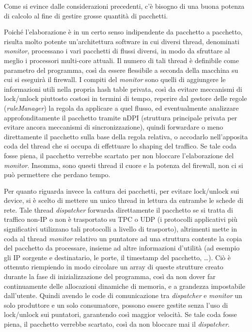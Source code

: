 Come si evince dalle considerazioni precedenti, c'è bisogno di una buona potenza di calcolo al fine di gestire grosse quantità di pacchetti.

Poiché l'elaborazione è in un certo senso indipendente da pacchetto a pacchetto, risulta molto potente un'architettura software in cui diversi thread, denominati \emph{monitor}, processano i vari pacchetti di flussi diversi, in modo da sfruttare al meglio i processori multi-core attuali. Il numero di tali thread è definibile come parametro del programma, così da essere flessibile a seconda della macchina su cui si eseguirà il firewall. I compiti del \emph{monitor} sono quelli di aggiungere le informazioni utili nella propria hash table privata, così da evitare meccanismi di lock/unlock piuttosto costosi in termini di tempo, reperire dal gestore delle regole (\emph{ruleManager}) la regola da applicare a quel flusso, ed eventualmente analizzare approfonditamente il pacchetto tramite nDPI (struttura principale privata per evitare ancora meccanismi di sincronizzazione), quindi forwardare o meno direttamente il pacchetto sulla base della regola relativa, o accodarlo nell'apposita coda del thread che si occupa di effettuare lo shaping del traffico. Se tale coda fosse piena, il pacchetto verrebbe scartato per non bloccare l'elaborazione del \emph{monitor}. Insomma, sono questi thread il cuore e la potenza del firewall, non ci si può permettere che perdano tempo.

Per quanto riguarda invece la cattura dei pacchetti, per evitare lock/unlock sui device, si è scelto di mettere un unico thread in lettura da entrambe le schede di rete. Tale thread \emph{dispatcher} forwarda direttamente il pacchetto se si tratta di traffico non-IP o non è trasportato su TPC o UDP (i protocolli applicativi più significativi utilizzano tali protocolli a livello di trasporto), altrimenti mette in coda al thread \emph{monitor} relativo un puntatore ad una struttura contente la copia del pacchetto da processare, insieme ad altre informazioni d'utilità (ad esempio gli IP sorgente e destinatario, le porte, il timestamp del pacchetto, \dots). Ciò è ottenuto riempiendo in modo circolare un array di queste strutture creato durante la fase di inizializzazione del programma, così da non dover far continuamente delle allocazioni dinamiche di memoria, e a grandezza impostabile dall'utente. Quindi avendo le code di comunicazione tra  \emph{dispatcher} e \emph{monitor} un solo produttore e un solo consumatore, possono essere gestite senza l'uso di lock/unlock sui puntatori, garantendo così maggior velocità. Se tale coda fosse piena, il pacchetto verrebbe scartato, così da non bloccare mai il \emph{dispatcher}.

